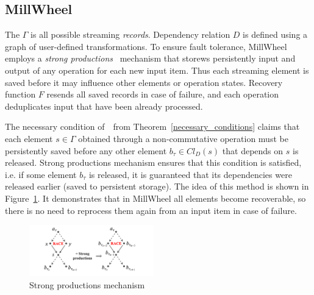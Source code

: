 \label{fs-eo-impl}



\subsection{MillWheel}

 The $\Gamma$ is all possible streaming {\em records}. Dependency relation $D$ is defined using a graph of user-defined transformations. 
 To ensure fault tolerance,   MillWheel employs a {\em strong productions}~\cite{Akidau:2013:MFS:2536222.2536229}   mechanism that storews persistently  input and output of any operation for each new  input item.
 Thus  each streaming element is saved  before it  may influence other elements or operation states. 
 Recovery function $F$ resends all saved records in case of failure, and each operation deduplicates input  that have been already processed.

The necessary condition of~\eo\ from Theorem~\ref{necessary_conditions} claims that each element $s \in \Gamma$ obtained through a non-commutative operation must be persistently saved before any other element $b_{\tau} \in Cl_D(s)$ that depends on $s$ is released. Strong productions mechanism ensures that this condition is satisfied, i.e. if some element $b_\tau$ is released, it is guaranteed that its dependencies were released earlier (saved to persistent storage). The idea of this method is shown in Figure~\ref{millwheel}. It demonstrates that in MillWheel all elements become recoverable, so there is no need to reprocess them again from an input item in case of failure. 

\begin{figure}[htbp]
  \centering
  \includegraphics[width=0.48\textwidth]{pics/millwheel}
  \caption{Strong productions mechanism}
  \label{millwheel}
\end{figure}

